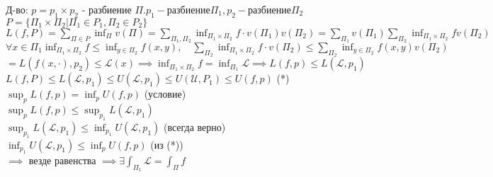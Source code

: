 \documentclass[12pt, a4paper]{article}
\theoremstyle{plain}
\begin{document}
    Д-во: $p = p_1 \times p_2$ - разбиение $\Pi$.$p_1 - разбиение \Pi_1, p_2 - разбиение \Pi_2$
    $P = \{ \Pi_1 \times \Pi_2 | \Pi_1 \in P_1, \Pi_2 \in P_2 \}$
    $L(f, P) = \sum_{\Pi \in P} \inf_\Pi v(\Pi) = \sum_{\Pi_1, \Pi_2} \inf_{\Pi_1 \times \Pi_2} f \cdot v(\Pi_1) v(\Pi_2) = 
    \sum_{\Pi_1} v(\Pi_1)\sum_{\Pi_2} \inf_{\Pi_1 \times \Pi_2} fv(\Pi_2)$\\

    $\displaystyle\forall x \in \Pi_1 \inf_{\Pi_1 \times \Pi_2} f \le \inf_{y \in \Pi_2} f(x,y), \quad 
    \sum_{\Pi_2}\inf_{\Pi_1 \times \Pi_2} f \cdot v(\Pi_2) \le \sum_{\Pi_2} \inf_{y \in \Pi_2} f(x,y)v(\Pi_2)$
    \\$ = L(f(x, \cdot), p_2) \le \mathscr{L}(x) \implies \inf_{\Pi_1 \times \Pi_2} f = \inf_{\Pi_1} \mathscr{L}
    \implies L(f, p) \le L(\mathscr{L}, p_1)$\\

    $L(f, P) \le L(\mathscr{L}, p_1) \le U(\mathscr{L}, p_1) \le U(\mathscr{U}, P_1) \le U(f, p)$ (*)\\

    $\sup_p L(f, p) = \inf_p U(f,p)$  (условие)\\

    $\sup_p L(f,p) \le \sup_{p_1} L(\mathscr{L}, p_1)$\\

    $\sup_{p_1}L(\mathscr{L}, p_1) \le \inf_{p_1} U(\mathscr{L}, p_1)$ (всегда верно)\\ 

    $\inf_{p_1} U(\mathscr{L}, p_1) \le \inf_{p} U(f,p)$ (из (*))
    \\

    $\implies $ везде равенства $\implies \exists\int_{\Pi_1}\mathscr{L} = \int_\Pi f$
\end{document}
